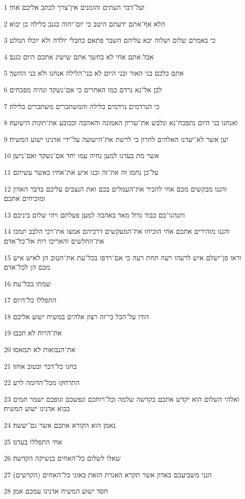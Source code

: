 \par 1 ועל־דבר העתים והזמנים אין־צרך לכתב אליכם אחי׃
\par 2 הלא אף־אתם ידעתם היטב כי יום־יהוה כגנב בלילה כן יבוא׃
\par 3 כי באמרם שלום ושלוה יבא עליהם השבר פתאם כחבלי יולדה ולא יוכלו המלט׃
\par 4 אבל אתם אחי לא בחשך אתם שישיג אתכם היום כגנב׃
\par 5 אתם כלכם בני האור ובני היום לא בני־הלילה אנחנו ולא בני החשך׃
\par 6 לכן אל־נא נרדם כמו האחרים כי אם־נשקד ונהיה מפכחים׃
\par 7 כי הנרדמים נרדמים בלילה והמשתכרים משתכרים בלילה׃
\par 8 ואנחנו בני היום נתפכח־נא ונלבש את־שריון האמונה והאהבה וככובע את־תקות הישועה׃
\par 9 יען אשר לא־יעדנו האלהים לחרון כי לרשת את־הישועה על־ידי אדנינו ישוע המשיח׃
\par 10 אשר מת בעדנו למען נחיה עמו יחד אם־נשקד ואם־נישן׃
\par 11 על־כן נחמו זה את־זה ובנו איש את־אחיו כאשר עשיתם׃
\par 12 והננו מבקשים מכם אחי להכיר את־העמלים בכם ואת הנצבים עליכם בדבר האדון ומוכיחים אתכם׃
\par 13 ותנהגו־בם כבוד גדול מאד באהבה למען פעלתם ויהי שלום ביניכם׃
\par 14 והננו מזהירים אתכם אחי הוכיחו את־המעקשים דרכיהם אמצו את־רכי הלבב תמכו את־החלשים והאריכו רוח אל־כל־אדם׃
\par 15 וראו פן־ישלם איש לרעהו רעה תחת רעה כי אם־רדפו בכל־עת את־הטוב הן לאיש איש מכם הן לכל־אדם׃
\par 16 שמחו בכל־עת׃
\par 17 התפללו כל־היום׃
\par 18 הודו על־הכל כי־זה רצון אלהים במשיח ישוע אליכם׃
\par 19 את־הרוח לא תכבו׃
\par 20 את־הנבואות לא תמאסו׃
\par 21 בחנו כל־דבר ובטוב אחזו׃
\par 22 התרחקו מכל־הדומה לרע׃
\par 23 ואלהי השלום הוא יקדש אתכם בקדשה שלמה וכל־רוחכם ונפשכם וגופכם ישמר תמים בבוא אדנינו ישוע המשיח׃
\par 24 נאמן הוא הקורא אתכם אשר גם־יעשה׃
\par 25 אחי התפללו בעדנו׃
\par 26 שאלו לשלום כל־האחים בנשיקה הקדשה׃
\par 27 הנני משביעכם באדון אשר תקרא האגרת הזאת באזני כל־האחים (הקדשים)׃
\par 28 חסד ישוע המשיח אדנינו עמכם אמן׃



